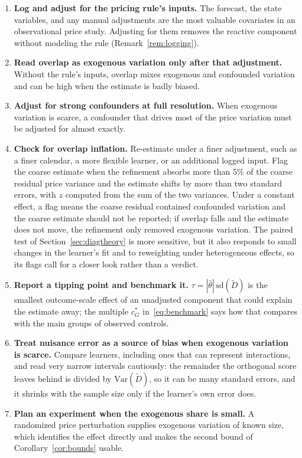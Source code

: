 \documentclass[11pt]{article}
\theoremstyle{remark}
\newcommand{\Var}{\mathrm{Var}}
\begin{document}
\begin{enumerate}
\item \textbf{Log and adjust for the pricing rule's inputs.} The forecast, the state variables, and any manual adjustments are the most valuable covariates in an observational price study. Adjusting for them removes the reactive component without modeling the rule (Remark~\ref{rem:logging}).
\item \textbf{Read overlap as exogenous variation only after that adjustment.} Without the rule's inputs, overlap mixes exogenous and confounded variation and can be high when the estimate is badly biased.
\item \textbf{Adjust for strong confounders at full resolution.} When exogenous variation is scarce, a confounder that drives most of the price variation must be adjusted for almost exactly.
\item \textbf{Check for overlap inflation.} Re-estimate under a finer adjustment, such as a finer calendar, a more flexible learner, or an additional logged input. Flag the coarse estimate when the refinement absorbs more than 5\% of the coarse residual price variance and the estimate shifts by more than two standard errors, with $z$ computed from the sum of the two variances. Under a constant effect, a flag means the coarse residual contained confounded variation and the coarse estimate should not be reported; if overlap falls and the estimate does not move, the refinement only removed exogenous variation. The paired test of Section~\ref{sec:diagtheory} is more sensitive, but it also responds to small changes in the learner's fit and to reweighting under heterogeneous effects, so its flags call for a closer look rather than a verdict.
\item \textbf{Report a tipping point and benchmark it.} $\tau = |\hat\theta|\,\mathrm{sd}(\tilde D)$ is the smallest outcome-scale effect of an unadjusted component that could explain the estimate away; the multiple $c^\ast_G$ in~\eqref{eq:benchmark} says how that compares with the main groups of observed controls.
\item \textbf{Treat nuisance error as a source of bias when exogenous variation is scarce.} Compare learners, including ones that can represent interactions, and read very narrow intervals cautiously: the remainder the orthogonal score leaves behind is divided by $\Var(\tilde D)$, so it can be many standard errors, and it shrinks with the sample size only if the learner's own error does.
\item \textbf{Plan an experiment when the exogenous share is small.} A randomized price perturbation supplies exogenous variation of known size, which identifies the effect directly and makes the second bound of Corollary~\ref{cor:bounds} usable.
\end{enumerate}
\end{document}
